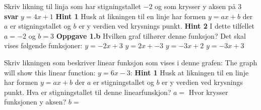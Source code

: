 \documentclass[12pt,twoside,onecolumn]{article}
\begin{document}
\begin{Exercise}
\begin{figure}[h!]
\begin{subfigure}{.5\textwidth}
    \end{subfigure}
\end{figure}
\end{Exercise}

\begin{Exercise}
Skriv likning til linja som har stigningstallet $-2$ og som krysser y aksen på $3$
\newline\newline
\textbf{svar}  
\newline
$y=4x+1$
\newline
\textbf{Hint 1}
\newline
Husk at likningen til en linje har formen $y=ax+b$ der $a$ er stigningstallet og $b$ er y verdien ved krysnings punkt.
\newline
\textbf{Hint 2}
\newline
I dette tilfellet $a=-2$ og $b=3$
\newline\newline
\textbf{Oppgave 1.b} Hvilken graf tilhører denne funksjon? 
\newline
{\color{Maroon}Det skal vises følgende funksjoner:
\newline
$y=-2x+3$
\newline
$y=2x+-3$
\newline
$y=-3x+2$
\newline
$y=-3x+3$
}
\end{Exercise}

\begin{Exercise}
Skriv likningen som beskriver linear funksjon som vises i denne grafen:
\newline
{\color{Maroon} The graph will show this linear function: $y = 6x-3$:}
\newline
\newline
\textbf{Hint 1}
\newline
Husk at likningen til en linje har formen $y=ax+b$ der $a$ er stigningstallet og $b$ er y verdien ved krysnings punkt.
Hva er stigningstallet til denne linearfunskjon? 
$a=$
Hvor krysser funksjonen y aksen? 
$b=$
\end{Exercise}
\end{document}
